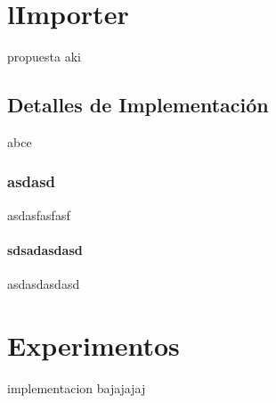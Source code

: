 \chapter{lImporter}\label{chapter:proposal}

propuesta aki

\section{Detalles de Implementación}
abce
\subsection{asdasd}
asdasfasfasf
\subsubsection{sdsadasdasd}
asdasdasdasd
\chapter{Experimentos}\label{chapter:implementation}
implementacion bajajajaj
